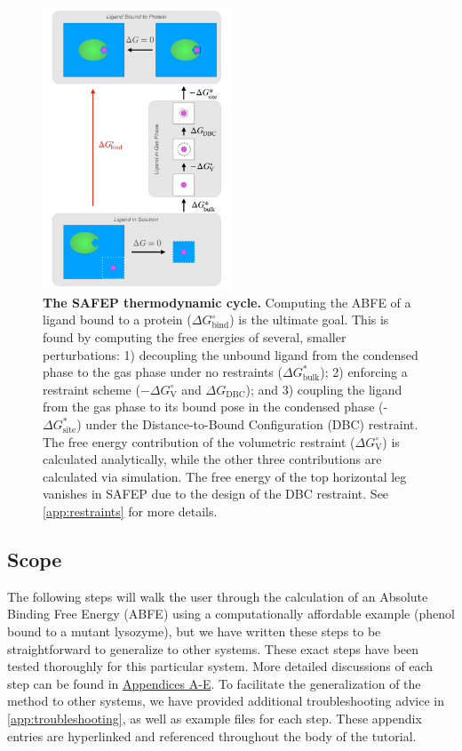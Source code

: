 \documentclass[9pt,tutorial,pubversion]{Styling/livecoms}
\begin{document}
\begin{figure}[!ht]
    \centering
    \includegraphics[width=0.5\textwidth]{SAFEP_cycle.pdf}
    \caption{\textbf{The SAFEP thermodynamic cycle.} 
    Computing the ABFE of a ligand bound to a protein ($\Delta G^\circ_\mathrm{bind}$) is the ultimate goal. 
    This is found by computing the free energies of several, smaller perturbations: 1) decoupling the unbound ligand from the condensed phase to the gas phase under no restraints ($\Delta G^*_{\mathrm{bulk}}$); 2) enforcing a restraint scheme ($-\Delta G^\circ_\mathrm{V}$ and $\Delta G_\mathrm{DBC}$); and 3) coupling the ligand from the gas phase to its bound pose in the condensed phase (-$\Delta G^*_{\mathrm{site}}$) under the Distance-to-Bound Configuration (DBC) restraint.
    The free energy contribution of the volumetric restraint ($\Delta G^\circ_\mathrm{V}$) is calculated analytically, while the other three contributions are calculated via simulation. The free energy of the top horizontal leg vanishes in SAFEP due to the design of the DBC restraint. See \ref{app:restraints} for more details.}
    \label{fig:cycle}
\end{figure}

\subsection{Scope}
The following steps will walk the user through the calculation of an Absolute Binding Free Energy (ABFE) using a computationally affordable example (phenol bound to a mutant lysozyme), but we have written these steps to be straightforward to generalize to other systems.
These exact steps have been tested thoroughly for this particular system.
More detailed discussions of each step can be found in \hyperref[app:motivation]{Appendices A-E}. To facilitate the generalization of the method to other systems, we have provided additional troubleshooting advice in \ref{app:troubleshooting}, as well as example files for each step.
These appendix entries are hyperlinked and referenced throughout the body of the tutorial.
\end{document}
